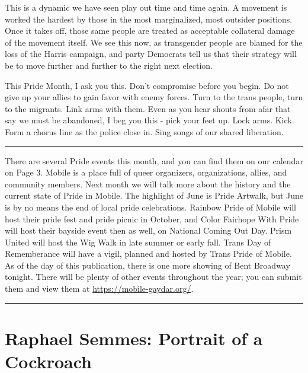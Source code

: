 \documentclass[
]{book}
\begin{document}
This is a dynamic we have seen play out time and time again. A movement is worked the hardest by those in the most marginalized, most outsider positions. Once it takes off, those same people are treated as acceptable collateral damage of the movement itself. We see this now, as transgender people are blamed for the loss of the Harris campaign, and party Democrats tell us that their strategy will be to move further and further to the right next election.

This Pride Month, I ask you this. Don't compromise before you begin. Do not give up your allies to gain favor with enemy forces. Turn to the trans people, turn to the migrants. Link arms with them. Even as you hear shouts from afar that say we must be abandoned, I beg you this - pick your feet up. Lock arms. Kick. Form a chorus line as the police close in. Sing songs of our shared liberation.

\begin{center}\rule{0.5\linewidth}{0.5pt}\end{center}

There are several Pride events this month, and you can find them on our calendar on Page 3. Mobile is a place full of queer organizers, organizations, allies, and community members. Next month we will talk more about the history and the current state of Pride in Mobile. The highlight of June is Pride Artwalk, but June is by no means the end of local pride celebrations. Rainbow Pride of Mobile will host their pride fest and pride picnic in October, and Color Fairhope With Pride will host their bayside event then as well, on National Coming Out Day. Prism United will host the Wig Walk in late summer or early fall. Trans Day of Rememberance will have a vigil, planned and hosted by Trans Pride of Mobile. As of the day of this publication, there is one more showing of Bent Broadway tonight. There will be plenty of other events throughout the year; you can submit them and view them at \url{https://mobile-gaydar.org/}.

\begin{center}\rule{0.5\linewidth}{0.5pt}\end{center}

\section*{Raphael Semmes: Portrait of a Cockroach}\label{raphael-semmes-portrait-of-a-cockroach}
\end{document}
